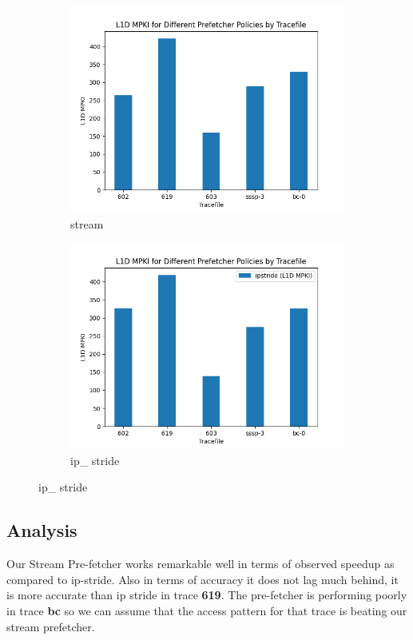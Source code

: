\documentclass{article}
\begin{document}
\begin{figure}[h!]

\centering
\begin{subfigure}{0.5\textwidth}
  \centering
  \includegraphics[width=\linewidth]{stream_L1DMPKI.png}
  \caption{stream}
  \label{1a}
\end{subfigure}%
\begin{subfigure}{0.5\textwidth}
  \centering
  \includegraphics[width=\linewidth]{ip_L1DMPKI.png}
  \caption{ip\_ stride}
  \label{1b}
\end{subfigure}

\end{figure}
\newpage
\vspace{-60pt}
\subsection{Analysis}
Our Stream Pre-fetcher works remarkable well in terms of observed speedup as compared to ip-stride. Also in terms of accuracy it does not lag much behind, it is more accurate than ip stride in trace \textbf{619}. The pre-fetcher is performing poorly in trace \textbf{bc} so we can assume that the access pattern for that trace is beating our stream prefetcher.
\end{document}
